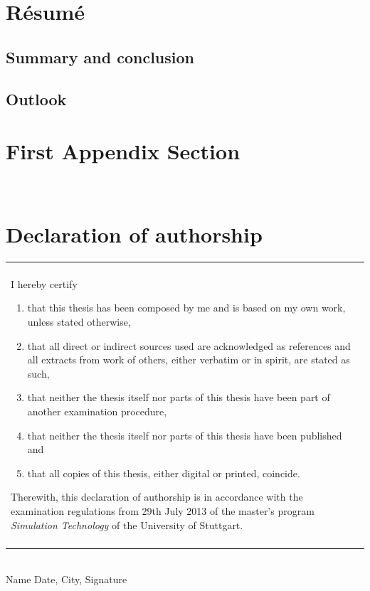 \documentclass[twoside,a4paper]{article}
\begin{document}
\section{R\'esum\'e}
\subsection{Summary and conclusion}

\subsection{Outlook}

%
%
\clearpage\newpage\null %
\newpage
\begin{appendices}
\section{First Appendix Section}

\newpage~\newpage
\section{Declaration of authorship}

\vspace{3cm}

\begin{table}[h!]
\centering
\begin{tabular}{|p{13cm}|}
\hline\\
	I hereby certify
	\begin{enumerate}
		\item that this thesis has been composed by me and is based on my own work, unless stated otherwise,
		\item that all direct or indirect sources used are acknowledged as references and all extracts from work of others, either verbatim or in spirit, are stated as such,
		\item that neither the thesis itself nor parts of this thesis have been part of another examination procedure,
		\item that neither the thesis itself nor parts of this thesis have been published and
		\item that all copies of this thesis, either digital or printed, coincide.
	\end{enumerate}
	Therewith, this declaration of authorship is in accordance with the examination regulations from 29th July 2013 of the master's program \emph{Simulation Technology} of the University of Stuttgart.\\\\
\hline
\end{tabular}
\end{table}

\vspace{4cm}
\hrulefill\\
Name
\hspace{7cm}
Date, City, Signature
\end{appendices}
\end{document}
